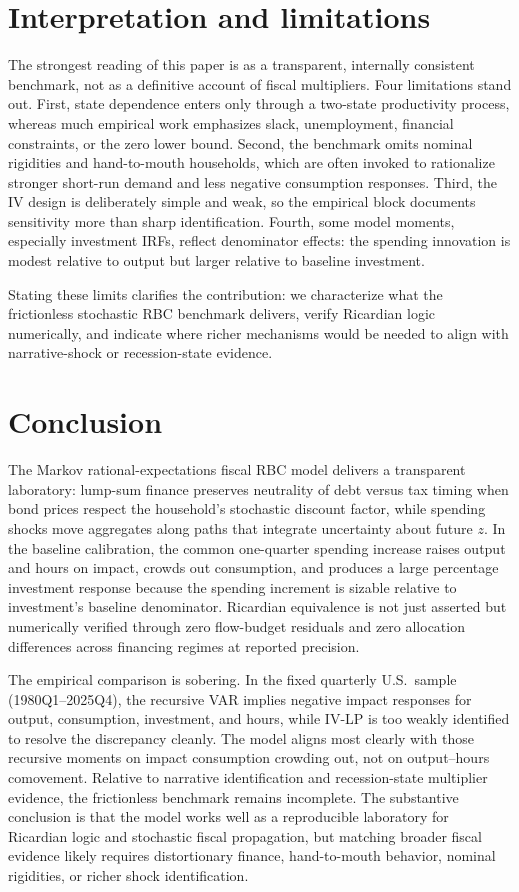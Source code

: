 \documentclass[11pt,a4paper]{article}
\begin{document}
\section{Interpretation and limitations}

The strongest reading of this paper is as a transparent, internally consistent benchmark, not as a definitive account of fiscal multipliers. Four limitations stand out. First, state dependence enters only through a two-state productivity process, whereas much empirical work emphasizes slack, unemployment, financial constraints, or the zero lower bound. Second, the benchmark omits nominal rigidities and hand-to-mouth households, which are often invoked to rationalize stronger short-run demand and less negative consumption responses. Third, the IV design is deliberately simple and weak, so the empirical block documents sensitivity more than sharp identification. Fourth, some model moments, especially investment IRFs, reflect denominator effects: the spending innovation is modest relative to output but larger relative to baseline investment.

Stating these limits clarifies the contribution: we characterize what the frictionless stochastic RBC benchmark delivers, verify Ricardian logic numerically, and indicate where richer mechanisms would be needed to align with narrative-shock or recession-state evidence.

\section{Conclusion}

The Markov rational-expectations fiscal RBC model delivers a transparent laboratory: lump-sum finance preserves neutrality of debt versus tax timing when bond prices respect the household's stochastic discount factor, while spending shocks move aggregates along paths that integrate uncertainty about future $z$. In the baseline calibration, the common one-quarter spending increase raises output and hours on impact, crowds out consumption, and produces a large percentage investment response because the spending increment is sizable relative to investment's baseline denominator. Ricardian equivalence is not just asserted but numerically verified through zero flow-budget residuals and zero allocation differences across financing regimes at reported precision.

The empirical comparison is sobering. In the fixed quarterly U.S.\ sample (1980Q1--2025Q4), the recursive VAR implies negative impact responses for output, consumption, investment, and hours, while IV-LP is too weakly identified to resolve the discrepancy cleanly. The model aligns most clearly with those recursive moments on impact consumption crowding out, not on output--hours comovement. Relative to narrative identification and recession-state multiplier evidence, the frictionless benchmark remains incomplete. The substantive conclusion is that the model works well as a reproducible laboratory for Ricardian logic and stochastic fiscal propagation, but matching broader fiscal evidence likely requires distortionary finance, hand-to-mouth behavior, nominal rigidities, or richer shock identification.
\end{document}
